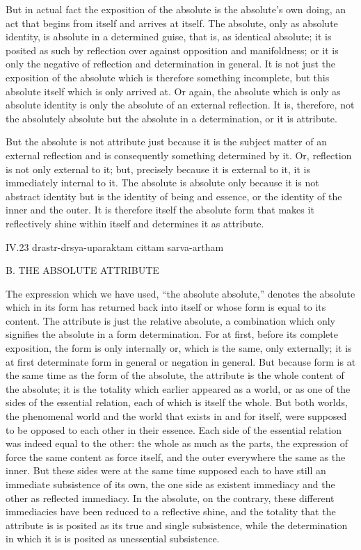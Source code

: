 But in actual fact
the exposition of the absolute
is the absolute's own doing,
an act that begins from itself
and arrives at itself.
The absolute, only as absolute identity,
is absolute in a determined guise,
that is, as identical absolute;
it is posited as such by reflection
over against opposition and manifoldness;
or it is only the negative of
reflection and determination in general.
It is not just the exposition of the absolute
which is therefore something incomplete,
but this absolute itself
which is only arrived at.
Or again, the absolute
which is only as absolute identity
is only the absolute of an external reflection.
It is, therefore, not the absolutely absolute
but the absolute in a determination,
or it is attribute.

But the absolute is not attribute just because
it is the subject matter of an external reflection
and is consequently something determined by it.
Or, reflection is not only external to it;
but, precisely because it is external to it,
it is immediately internal to it.
The absolute is absolute only because
it is not abstract identity
but is the identity of being and essence,
or the identity of the inner and the outer.
It is therefore itself the absolute form
that makes it reflectively shine within itself
and determines it as attribute.

IV.23
drastr-drsya-uparaktam cittam sarva-artham

B. THE ABSOLUTE ATTRIBUTE

The expression which we have used, “the absolute absolute,”
denotes the absolute which in its form
has returned back into itself
or whose form is equal to its content.
The attribute is just the relative absolute,
a combination which only signifies the absolute
in a form determination.
For at first, before its complete exposition,
the form is only internally
or, which is the same, only externally;
it is at first determinate form in general
or negation in general.
But because form is at the same time
as the form of the absolute,
the attribute is the whole content of the absolute;
it is the totality which earlier appeared as a world,
or as one of the sides of the essential relation,
each of which is itself the whole.
But both worlds, the phenomenal world
and the world that exists in and for itself,
were supposed to be opposed
to each other in their essence.
Each side of the essential relation was
indeed equal to the other:
the whole as much as the parts,
the expression of force the same content
as force itself,
and the outer everywhere the same as the inner.
But these sides were at the same time
supposed each to have still
an immediate subsistence of its own,
the one side as existent immediacy
and the other as reflected immediacy.
In the absolute, on the contrary,
these different immediacies have been
reduced to a reflective shine,
and the totality that the attribute is
is posited as its true and single subsistence,
while the determination in which it is
is posited as unessential subsistence.

